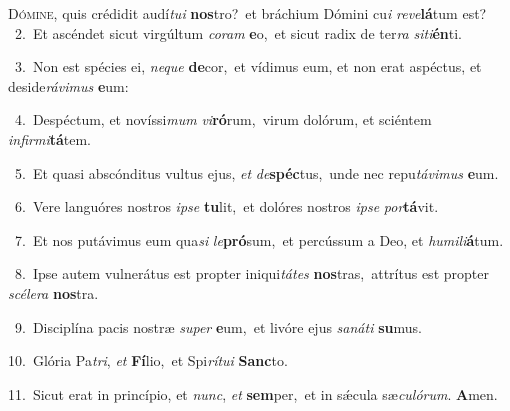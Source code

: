 \lettrine{\initial\textcolor{\initialcolor}{D}}{ómine,} quis crédidit audí\-\textit{tu}\-\textit{i} \textbf{nos}\-tro?~\star et bráchium Dómini cu\textit{i} \textit{re}\-\textit{ve}\textbf{lá}tum est?\\
{\numbfont\textcolor{\numbcolor}{~2.}}~Et ascéndet sicut virgúltum \textit{co}\-\textit{ram} \textbf{e}\-o,~\star et sicut radix de ter\textit{ra} \textit{si}\-\textit{ti}\textbf{én}ti.\par
{\numbfont\textcolor{\numbcolor}{~3.}}~Non est spécies ei, \textit{ne}\-\textit{que} \textbf{de}\-cor,~\star et vídimus eum, et non erat aspéctus, et deside\-\textit{rá}\-\textit{vi}\textit{mus} \textbf{e}\-um:\par
{\numbfont\textcolor{\numbcolor}{~4.}}~Despéctum, et novíssi\textit{mum} \textit{vi}\-\textbf{ró}rum,~\star virum dolórum, et sciéntem \textit{in}\-\textit{fir}\textit{mi}\textbf{tá}tem.\par
{\numbfont\textcolor{\numbcolor}{~5.}}~Et quasi abscónditus vultus ejus, \textit{et} \textit{de}\-\textbf{spéc}tus,~\star unde nec repu\-\textit{tá}\-\textit{vi}\textit{mus} \textbf{e}\-um.\par
{\numbfont\textcolor{\numbcolor}{~6.}}~Vere languóres nostros \textit{ip}\-\textit{se} \textbf{tu}\-lit,~\star et dolóres nostros \textit{ip}\-\textit{se} \textit{por}\-\textbf{tá}vit.\par
{\numbfont\textcolor{\numbcolor}{~7.}}~Et nos putávimus eum qua\textit{si} \textit{le}\-\textbf{pró}sum,~\star et percússum a Deo, et \textit{hu}\-\textit{mi}\textit{li}\textbf{á}tum.\par
{\numbfont\textcolor{\numbcolor}{~8.}}~Ipse autem vulnerátus est propter iniqui\-\textit{tá}\-\textit{tes} \textbf{nos}\-tras,~\star attrítus est propter \textit{scé}\-\textit{le}\textit{ra} \textbf{nos}\-tra.\par
{\numbfont\textcolor{\numbcolor}{~9.}}~Disciplína pacis nostræ \textit{su}\-\textit{per} \textbf{e}\-um,~\star et livóre ejus \textit{sa}\-\textit{ná}\textit{ti} \textbf{su}\-mus.\par
{\numbfont\textcolor{\numbcolor}{10.}}~Glória Pa\-\textit{tri}\-, \textit{et} \textbf{Fí}\-lio,~\star et Spi\-\textit{rí}\-\textit{tu}\textit{i} \textbf{Sanc}\-to.\par
{\numbfont\textcolor{\numbcolor}{11.}}~Sicut erat in princípio, et \textit{nunc}\-, \textit{et} \textbf{sem}\-per,~\star et in sǽcula sæ\-\textit{cu}\-\textit{ló}\textit{rum}. \textbf{A}\-men.\par
